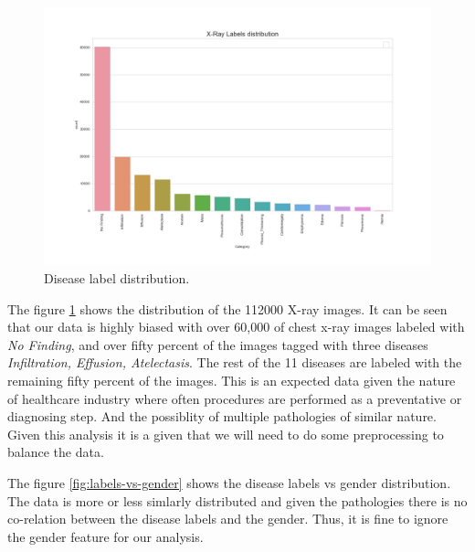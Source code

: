 \documentclass{article}
\begin{document}
    \begin{figure}
        \includegraphics[width=\linewidth]{./images/labels_distribution.jpg}
        \caption{Disease label distribution.}
        \label{fig:labels-distribution}
    \end{figure}
    
    The figure \ref{fig:labels-distribution} shows the distribution of the 112000 X-ray images. It can be seen that our data is highly biased with over 60,000 of chest x-ray images labeled with \textit{No Finding}, and over fifty percent of the images tagged with three diseases \textit{Infiltration, Effusion, Atelectasis}. The rest of the 11 diseases are labeled with the remaining fifty percent of the images. This is an expected data given the nature of healthcare industry where often procedures are performed as a preventative or diagnosing step. And the possiblity of multiple pathologies of similar nature. Given this analysis it is a given that we will need to do some preprocessing to balance the data.

    The figure \ref{fig:labels-vs-gender} shows the disease labels vs gender distribution. The data is more or less simlarly distributed and given the pathologies there is no co-relation between the disease labels and the gender. Thus, it is fine to ignore the gender feature for our analysis.
\end{document}

